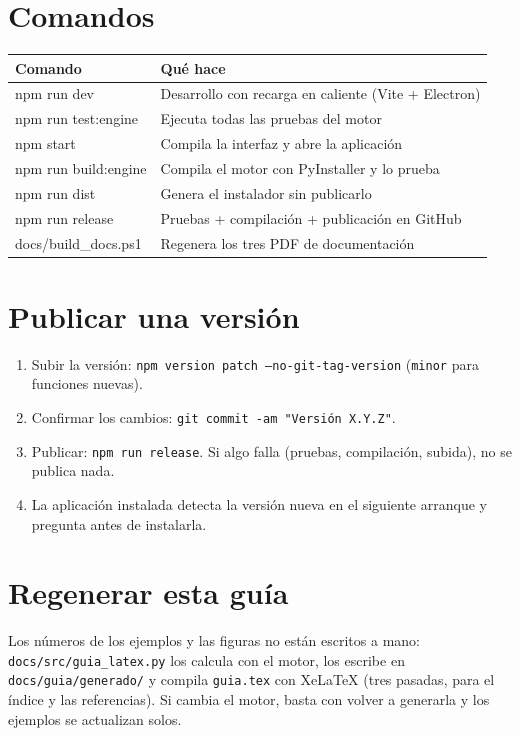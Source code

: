 \section{Comandos}
\begin{center}\small
\begin{tabular}{@{}>{\ttfamily}ll@{}}\toprule
\normalfont\textbf{Comando} & \textbf{Qué hace}\\ \midrule
npm run dev & Desarrollo con recarga en caliente (Vite + Electron)\\
npm run test:engine & Ejecuta todas las pruebas del motor\\
npm start & Compila la interfaz y abre la aplicación\\
npm run build:engine & Compila el motor con PyInstaller y lo prueba\\
npm run dist & Genera el instalador sin publicarlo\\
npm run release & Pruebas + compilación + publicación en GitHub\\
docs/build\_docs.ps1 & Regenera los tres PDF de documentación\\ \bottomrule
\end{tabular}
\end{center}

\section{Publicar una versión}
\begin{enumerate}
\item Subir la versión: \texttt{npm version patch --no-git-tag-version} (\texttt{minor} para funciones nuevas).
\item Confirmar los cambios: \texttt{git commit -am "Versión X.Y.Z"}.
\item Publicar: \texttt{npm run release}. Si algo falla (pruebas, compilación, subida), no se publica nada.
\item La aplicación instalada detecta la versión nueva en el siguiente arranque y pregunta antes de instalarla.
\end{enumerate}

\section{Regenerar esta guía}
Los números de los ejemplos y las figuras no están escritos a mano: \texttt{docs/src/guia\_latex.py} los calcula con el motor, los escribe
en \texttt{docs/guia/generado/} y compila \texttt{guia.tex} con XeLaTeX (tres pasadas, para el índice y las referencias). Si cambia el motor,
basta con volver a generarla y los ejemplos se actualizan solos.


